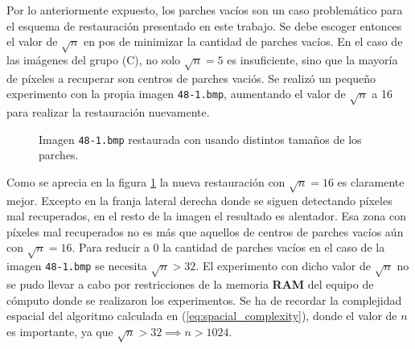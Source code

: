  Por lo anteriormente expuesto, los parches vac\'ios son un caso problem\'atico para el esquema de restauraci\'on presentado en este trabajo. Se debe escoger entonces el valor de $\sqrt{n}$ en pos de minimizar la cantidad de parches vac\'ios. En el caso de las im\'agenes del grupo (C), no solo $\sqrt{n} = 5$ es insuficiente, sino que la mayor\'ia de p\'ixeles a recuperar son centros de parches vaci\'os. Se realiz\'o un pequeño experimento con la propia imagen \texttt{48-1.bmp}, aumentando el valor de $\sqrt{n}$ a 16 para realizar la restauraci\'on nuevamente.
 \begin{figure}[H]
 	\centering
 	\caption{Imagen \texttt{48-1.bmp} restaurada con \SOP usando distintos tamaños de los parches.}
 	\label{fig:patches_diffs}
 \end{figure}
Como se aprecia en la figura \ref{fig:patches_diffs} la nueva restauraci\'on con $\sqrt{n} = 16$ es claramente mejor. Excepto en la franja lateral derecha donde se siguen detectando p\'ixeles mal recuperados, en el resto de la imagen el resultado es alentador. Esa zona con p\'ixeles mal recuperados no es m\'as que aquellos de centros de parches vac\'ios a\'un con $\sqrt{n} = 16$. Para reducir a 0 la cantidad de parches vac\'ios en el caso de la imagen \texttt{48-1.bmp} se necesita $\sqrt{n} > 32$. El experimento con dicho valor de $\sqrt{n}$ no se pudo llevar a cabo por restricciones de la memoria \textbf{RAM} del equipo de c\'omputo donde se realizaron los experimentos. Se ha de recordar la complejidad espacial del algoritmo calculada en (\ref{eq:spacial_complexity}), donde el valor de $n$ es importante, ya que $\sqrt{n} > 32 \implies n > 1024$.

